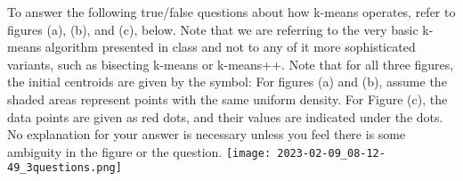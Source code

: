 \documentclass[11pt]{article}
\begin{document}
\begin{itemize}
%
%
%

\newpage
{}
To answer the following true/false questions about how k-means operates, refer to figures (a), (b), and (c), below.  Note that we are referring to the very basic k-means algorithm presented in class and not to any of it more sophisticated variants, such as bisecting k-means or k-means++.
Note that for all three figures, the initial centroids are given by the symbol:
For figures (a) and (b), assume the shaded areas represent points with the same uniform density. For Figure (c), the data points are given as red dots, and their values are indicated under the dots. No explanation for your answer is necessary unless you feel there is some ambiguity in the figure or the question.
\texttt{[image: 2023-02-09\_08-12-49\_3questions.png]}


\end{itemize}
\end{document}
